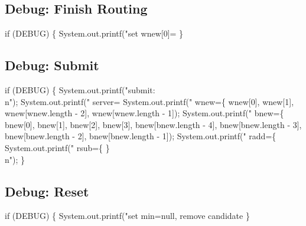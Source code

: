 \subsection{Debug: Finish Routing}

\nwenddocs{}\endmoddef\nwstartdeflinemarkup{}\nwenddeflinemarkup
if (DEBUG) \{
  System.out.printf("set wnew[0]=%
\}
\nwendcode{}\nwdocspar

\subsection{Debug: Submit}

\nwenddocs{}\endmoddef\nwstartdeflinemarkup{}\nwenddeflinemarkup
if (DEBUG) \{
  System.out.printf("submit:\\n");
  System.out.printf("  server=%
  System.out.printf("  wnew=\{ %
      wnew[0], wnew[1], wnew[wnew.length - 2], wnew[wnew.length - 1]);
  System.out.printf("  bnew=\{ %
      bnew[0], bnew[1], bnew[2], bnew[3],
      bnew[bnew.length - 4], bnew[bnew.length - 3], bnew[bnew.length - 2], bnew[bnew.length - 1]);
  System.out.printf("  radd=\{ %
  System.out.printf("  rsub=\{ \}\\n");
\}
\nwendcode{}\nwdocspar

\subsection{Debug: Reset}

\nwenddocs{}\endmoddef\nwstartdeflinemarkup{}\nwenddeflinemarkup
if (DEBUG) \{
  System.out.printf("set min=null, remove candidate %
\}
\nwendcode{}\nwdocspar

